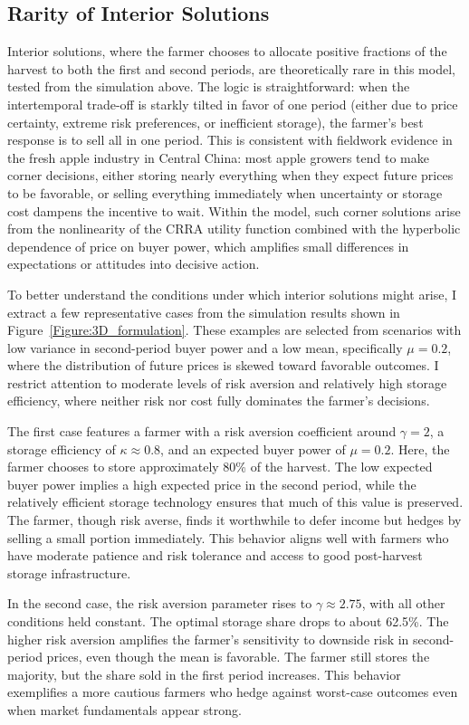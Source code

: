 \subsection{Rarity of Interior Solutions}
Interior solutions, where the farmer chooses to allocate positive fractions of the harvest to both the first and second periods, are theoretically rare in this model, tested from the simulation above. The logic is straightforward: when the intertemporal trade-off is starkly tilted in favor of one period (either due to price certainty, extreme risk preferences, or inefficient storage), the farmer's best response is to sell all in one period. This is consistent with fieldwork evidence in the fresh apple industry in Central China: most apple growers tend to make corner decisions, either storing nearly everything when they expect future prices to be favorable, or selling everything immediately when uncertainty or storage cost dampens the incentive to wait. Within the model, such corner solutions arise from the nonlinearity of the CRRA utility function combined with the hyperbolic dependence of price on buyer power, which amplifies small differences in expectations or attitudes into decisive action.

To better understand the conditions under which interior solutions might arise, I extract a few representative cases from the simulation results shown in Figure~\ref{Figure:3D_formulation}. These examples are selected from scenarios with low variance in second-period buyer power and a low mean, specifically $\mu = 0.2$, where the distribution of future prices is skewed toward favorable outcomes. I restrict attention to moderate levels of risk aversion and relatively high storage efficiency, where neither risk nor cost fully dominates the farmer's decisions.

The first case features a farmer with a risk aversion coefficient around $\gamma = 2$, a storage efficiency of $\kappa \approx 0.8$, and an expected buyer power of $\mu = 0.2$. Here, the farmer chooses to store approximately 80\% of the harvest. The low expected buyer power implies a high expected price in the second period, while the relatively efficient storage technology ensures that much of this value is preserved. The farmer, though risk averse, finds it worthwhile to defer income but hedges by selling a small portion immediately. This behavior aligns well with farmers who have moderate patience and risk tolerance and access to good post-harvest storage infrastructure.

In the second case, the risk aversion parameter rises to $\gamma \approx 2.75$, with all other conditions held constant. The optimal storage share drops to about 62.5\%. The higher risk aversion amplifies the farmer's sensitivity to downside risk in second-period prices, even though the mean is favorable. The farmer still stores the majority, but the share sold in the first period increases. This behavior exemplifies a more cautious farmers who hedge against worst-case outcomes even when market fundamentals appear strong.

